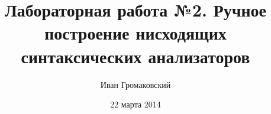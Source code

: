 \documentclass[a4paper]{article}
\begin{document}
\title{Лабораторная работа №2. Ручное построение нисходящих синтаксических анализаторов}
\author{Иван Громаковский}
\date{22 марта 2014}
\maketitle





\end{document}
